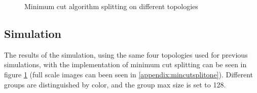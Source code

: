 \begin{figure}[t!]
	\centering
		\qquad
		\qquad

		\qquad
		\qquad	
		\caption{Minimum cut algorithm splitting on different topologies}%
		\label{fig:mincutresults}%
\end{figure}


\subsection{Simulation}
The results of the simulation, using the same four topologies used for previous simulations, with the implementation of minimum cut splitting can be seen in figure \ref{fig:mincutresults} (full scale images can been seen in \ref{appendix:mincutsplitone}). Different groups are distinguished by color, and the group max size is set to 128. 

